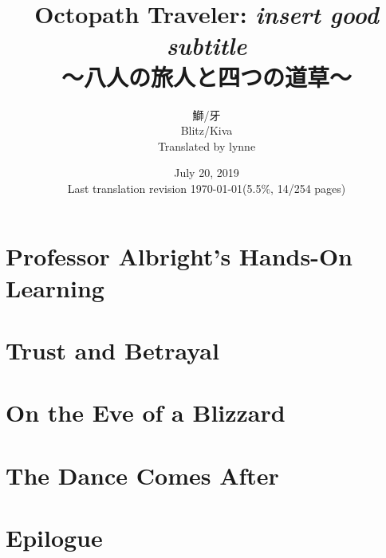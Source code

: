 \documentclass[a4paper,11pt]{memoir}
\title{%
Octopath Traveler: \emph{insert good subtitle} \\
\large{～八人の旅人と四つの道草～}
}
\author{%
鰤/牙 \\
Blitz/Kiva \\
Translated by lynne
}
\date{%
July 20, 2019 \\
Last translation revision \today  (5.5\%, 14/254 pages)
}
\begin{document}
	\maketitle
	\pagebreak
	\tableofcontents
	\pagebreak
	\chapter{Professor Albright's Hands-On Learning}
		
	\chapter{Trust and Betrayal}
	\chapter{On the Eve of a Blizzard}
	\chapter{The Dance Comes After}
	\chapter{Epilogue}
\end{document}

